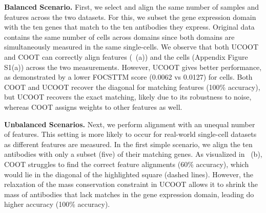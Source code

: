 
\textbf{Balanced Scenario.} First, we select and align the same number of samples and features
across the two datasets. For this, we subset the gene expression domain with the ten genes that
match to the ten antibodies they express. Original data contains the same number of cells
across domains since both domains are simultaneously measured in the same single-cells.
We observe that both UCOOT and COOT can correctly align features (~(a))
and the cells (Appendix Figure S1(a)) across the two measurements. However,
UCOOT gives better performance, as demonstrated by a lower FOCSTTM score (0.0062 vs 0.0127)
for cells. Both COOT and UCOOT recover the diagonal for matching features (100\% accuracy),
but UCOOT recovers the exact matching, likely due to its robustness to noise,
whereas COOT assigns weights to other features as well.

\textbf{Unbalanced Scenarios.} Next, we perform alignment with an unequal number of features.
This setting is more likely to occur for real-world single-cell datasets as different features
are measured. In the first simple scenario, we align the ten antibodies with only a subset (five)
of their matching genes. As visualized in ~(b),
COOT struggles to find the correct feature alignments (60\% accuracy),
which would lie in the diagonal of the highlighted square (dashed lines). However,
the relaxation of the mass conservation constraint in UCOOT allows it to shrink
the mass of antibodies that lack matches in the gene expression domain,
leading do higher accuracy (100\% accuracy).

